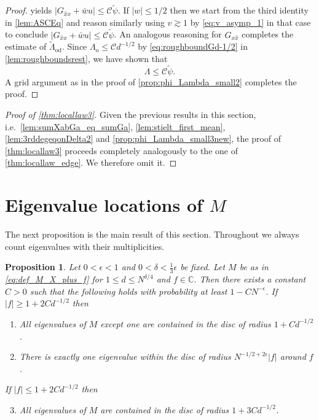 \documentclass[11pt]{article}
\newcommand{\abs}[1]{\left| #1 \right|}
\newcommand{\C}{\mathbb{C}}
\theoremstyle{plain}
\newtheorem{prop}{Proposition}[section]
\theoremstyle{remark}
\numberwithin{equation}{section}
\newcommand*\ubarr[1]{{\widehat{#1}}}
\begin{document}
\begin{proof}
		yields $\abs{G_{\ubarr{x}x} + \bar w u} \leq \mathcal C \widetilde{\psi}$. 
		If $\abs{w} \leq 1/2$ then we start from the third identity in \cref{lem:ASCEq} and reason similarly using $v \gtrsim 1$ by \eqref{eq:v_asymp_1} in that case  to conclude $\abs{G_{\ubarr{x}x} + \bar w u} \leq \mathcal C \widetilde{\psi}$. 
		An analogous reasoning for $G_{x \ubarr{x}}$ completes the estimate of $\widetilde{\Lambda}_{\mathrm{od}}$.
		Since ${\Lambda}_\mathrm{o}\leq \mathcal C d^{-1/2}$ by \eqref{eq:roughboundGd-1/2} in \cref{lem:roughboundsrest}, we have shown that 
		\begin{equation*}
			\Lambda \le \mathcal C \widetilde{\psi}. 
		\end{equation*}
		A grid argument as in the proof of \cref{prop:phi_Lambda_small2} completes the proof.
	\end{proof}
	
	\begin{proof}[Proof of \cref{thm:locallaw3}]
		 Given the previous results in this section, i.e.\ \cref{lem:sumXabGa_eq_sumGa}, \cref{lem:stielt_first_mean}, \cref{lem:3rddegeqonDelta2}
		and \cref{prop:phi_Lambda_small3new}, the proof of \cref{thm:locallaw3} 
		proceeds completely analogously to the one of 
		\cref{thm:locallaw_edge}. We therefore omit it. 
	\end{proof}
	
	
	
	\section{Eigenvalue locations of $M$} \label{sec:largest_eigenvalue}

 The next proposition is the main result of this section. Throughout we always count eigenvalues with their multiplicities. 

\begin{prop}\label{prop:spectrum_M} 
Let $0 < \epsilon < 1$ and $0 <\delta < \frac{1}{3}\epsilon$ be fixed. Let $M$ be as in \eqref{eq:def_M_X_plus_f} for $1 \le d \le N^{\delta/4}$ and $f \in \C$. Then there exists a  constant $C>0$ such that the following holds with probability at least $1- CN^{-\epsilon}$.
If $\abs{f} \geq 1 + 2 C d^{-1/2}$ then 
\begin{enumerate}[label=(\alph*)]
    \item \label{item:other_eigenvalues_disc} All eigenvalues of $M$ except one are contained in the disc of radius $  1 + C d^{-1/2} $.
    \item \label{item:large_eigenvalue} There is exactly one eigenvalue within the disc of radius $N^{-1/2 + 2\epsilon}|f|$ around $f$.
\end{enumerate}
If $\abs{f} \leq 1 + 2 C d^{-1/2}$ then 
\begin{enumerate}[label=(\alph*)]
\setcounter{enumi}{2} 
\item All eigenvalues of $M$ are contained in the disc of radius $  1 + 3C d^{-1/2} $.
\end{enumerate} 
\end{prop}
\end{document}
